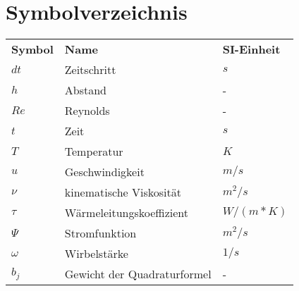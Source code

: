 \chapter*{Symbolverzeichnis}

\begingroup

    \setlength{\tabcolsep}{20pt}        %
    \renewcommand{\arraystretch}{1.3}   %
    
    \begin{longtable*}[l]{l l l}
    
        \textbf{Symbol} & \textbf{Name} & \textbf{SI-Einheit} \\
    
        $dt$&Zeitschritt&$s$\\
        $h$&Abstand&-\\
        $Re$&Reynolds&-\\
        $t$&Zeit&$s$\\
        $T$&Temperatur&$K$ \\
        $u$& Geschwindigkeit&$m/s$\\
        $\nu$&kinematische Viskosität& $m^2/s$\\
        $\tau$& Wärmeleitungskoeffizient &$W/(m*K)$\\
        $\Psi$&Stromfunktion&$m^2/s$\\
        $\omega$ & Wirbelstärke & $1/s$ \\
        $b_j$& Gewicht der Quadraturformel&-\\
    
    \end{longtable*}
\endgroup